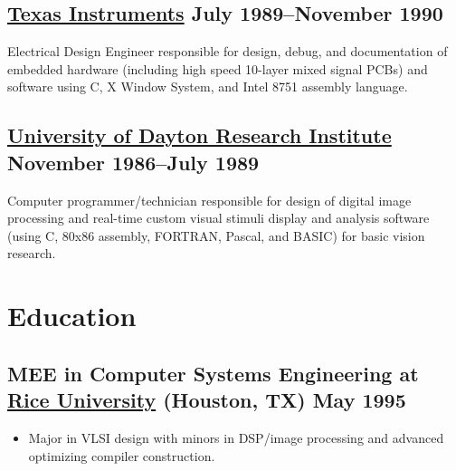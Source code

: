\documentclass[10pt,letterpaper,oneside]{report}
\begin{document}
\medskip

\begin{minipage}{\textwidth}
  \subsection[Texas Instruments]{
    {\href{http://www.ti.com/}{Texas Instruments} \hfill July 1989--November 1990}
  }

  Electrical Design Engineer responsible for design, debug, and documentation of
  embedded hardware (including high speed 10-layer mixed signal PCBs) and
  software using C, X Window System, and Intel 8751 assembly language.
\end{minipage}

\medskip

\begin{minipage}{\textwidth}
  \subsection[University of Dayton Research Institute]{
    \href{http://www.udri.udayton.edu/AboutUDRI/}{University of Dayton Research
    Institute} \hfill November 1986--July 1989
  }

  Computer programmer/technician responsible for design of digital image
  processing and real-time custom visual stimuli display and analysis
  software (using C, 80x86 assembly, FORTRAN, Pascal, and BASIC) for basic vision research.
\end{minipage}

\section{Education}

\begin{minipage}{\textwidth}
  \subsection[MEE in Computer Systems Engineering]{
    MEE in Computer Systems Engineering at
    \href{http://www.ece.rice.edu/}{Rice University}
    {\small (Houston, TX)} \hfill May 1995
  }

  \begin{itemize}
    \item Major in VLSI design with minors in DSP/image processing and advanced
      optimizing compiler construction.
  \end{itemize}
\end{minipage}
\end{document}
